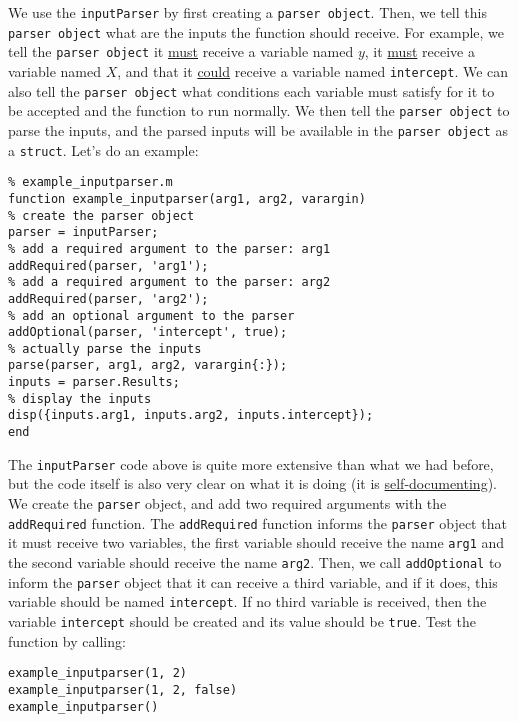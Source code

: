 \documentclass[12pt, a4paper]{article}
\begin{document}
We use the \texttt{inputParser} by first creating a \texttt{parser object}.
Then, we tell this \texttt{parser object} what are the inputs the function should receive.
For example, we tell the \texttt{parser object} it \uline{must} receive a variable named \(y\), it \uline{must} receive a variable named \(X\), and that it \uline{could} receive a variable named \texttt{intercept}.
We can also tell the \texttt{parser object} what conditions each variable must satisfy for it to be accepted and the function to run normally.
We then tell the \texttt{parser object} to parse the inputs, and the parsed inputs will be available in the \texttt{parser object} as a \texttt{struct}.
Let's do an example:
\lstset{language=matlab,label= ,caption= ,captionpos=b,firstnumber=1,numbers=left,style=Matlab-editor}
\begin{lstlisting}
% example_inputparser.m
function example_inputparser(arg1, arg2, varargin)
% create the parser object
parser = inputParser;
% add a required argument to the parser: arg1
addRequired(parser, 'arg1');
% add a required argument to the parser: arg2
addRequired(parser, 'arg2');
% add an optional argument to the parser
addOptional(parser, 'intercept', true);
% actually parse the inputs
parse(parser, arg1, arg2, varargin{:});
inputs = parser.Results;
% display the inputs
disp({inputs.arg1, inputs.arg2, inputs.intercept});
end
\end{lstlisting}
The \texttt{inputParser} code above is quite more extensive than what we had before, but the code itself is also very clear on what it is doing (it is \href{https://en.wikipedia.org/wiki/Self-documenting\_code}{self-documenting}).
We create the \texttt{parser} object, and add two required arguments with the \texttt{addRequired} function.
The \texttt{addRequired} function informs the \texttt{parser} object that it must receive two variables, the first variable should receive the name \texttt{arg1} and the second variable should receive the name \texttt{arg2}.
Then, we call \texttt{addOptional} to inform the \texttt{parser} object that it can receive a third variable, and if it does, this variable should be named \texttt{intercept}.
If no third variable is received, then the variable \texttt{intercept} should be created and its value should be \texttt{true}.
Test the function by calling:
\lstset{language=matlab,label= ,caption= ,captionpos=b,firstnumber=1,numbers=left,style=Matlab-editor}
\begin{lstlisting}
example_inputparser(1, 2)
example_inputparser(1, 2, false)
example_inputparser()
\end{lstlisting}
\end{document}
